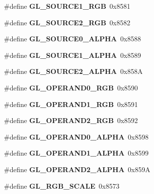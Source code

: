 \begin{DoxyCompactItemize}
\item 
\#define {\bfseries G\+L\+\_\+\+S\+O\+U\+R\+C\+E1\+\_\+\+R\+G\+B}~0x8581\label{_s_d_l__opengl_8h_a6b7e9b816088b68a2f6549eec0bee1b7}

\item 
\#define {\bfseries G\+L\+\_\+\+S\+O\+U\+R\+C\+E2\+\_\+\+R\+G\+B}~0x8582\label{_s_d_l__opengl_8h_a3821b7f8c55b1dffbee97dfa2400003a}

\item 
\#define {\bfseries G\+L\+\_\+\+S\+O\+U\+R\+C\+E0\+\_\+\+A\+L\+P\+H\+A}~0x8588\label{_s_d_l__opengl_8h_aeae9bfcce5a919f700d60fc24a36e3bf}

\item 
\#define {\bfseries G\+L\+\_\+\+S\+O\+U\+R\+C\+E1\+\_\+\+A\+L\+P\+H\+A}~0x8589\label{_s_d_l__opengl_8h_ad0201b0486b1e48c92cd0e98aebb3d05}

\item 
\#define {\bfseries G\+L\+\_\+\+S\+O\+U\+R\+C\+E2\+\_\+\+A\+L\+P\+H\+A}~0x858\+A\label{_s_d_l__opengl_8h_af9507cfed117a6fb4a90f1c2f8457707}

\item 
\#define {\bfseries G\+L\+\_\+\+O\+P\+E\+R\+A\+N\+D0\+\_\+\+R\+G\+B}~0x8590\label{_s_d_l__opengl_8h_a97cb8ba4f6f099566ab373ad4254cd65}

\item 
\#define {\bfseries G\+L\+\_\+\+O\+P\+E\+R\+A\+N\+D1\+\_\+\+R\+G\+B}~0x8591\label{_s_d_l__opengl_8h_ae33197196d9b7d4171c133728294e2d9}

\item 
\#define {\bfseries G\+L\+\_\+\+O\+P\+E\+R\+A\+N\+D2\+\_\+\+R\+G\+B}~0x8592\label{_s_d_l__opengl_8h_a0065ddd6026c47784f8f9c4b14e30203}

\item 
\#define {\bfseries G\+L\+\_\+\+O\+P\+E\+R\+A\+N\+D0\+\_\+\+A\+L\+P\+H\+A}~0x8598\label{_s_d_l__opengl_8h_a4858581ec49b6bb7a23205a1103984a1}

\item 
\#define {\bfseries G\+L\+\_\+\+O\+P\+E\+R\+A\+N\+D1\+\_\+\+A\+L\+P\+H\+A}~0x8599\label{_s_d_l__opengl_8h_a98df3c998ca3bbe641306fbcc5ba7426}

\item 
\#define {\bfseries G\+L\+\_\+\+O\+P\+E\+R\+A\+N\+D2\+\_\+\+A\+L\+P\+H\+A}~0x859\+A\label{_s_d_l__opengl_8h_a929e99a6d416dd551747b4123fc1fac4}

\item 
\#define {\bfseries G\+L\+\_\+\+R\+G\+B\+\_\+\+S\+C\+A\+L\+E}~0x8573\label{_s_d_l__opengl_8h_add3c8e05aff8c0afefa64707ef366915}


\end{DoxyCompactItemize}
